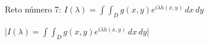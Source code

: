 

\bigskip

\enunciadoS Reto n\'umero 7:
$I(\lambda)=\int\!\!\int_D g(x,y)e^{i\lambda h(x,y)}\,dx\,dy$

\bigskip

\respuestaS

|$I(\lambda)=\int\!\!\int_D g(x,y)e^{i\lambda h(x,y)}\,dx\,dy$|

\bye

